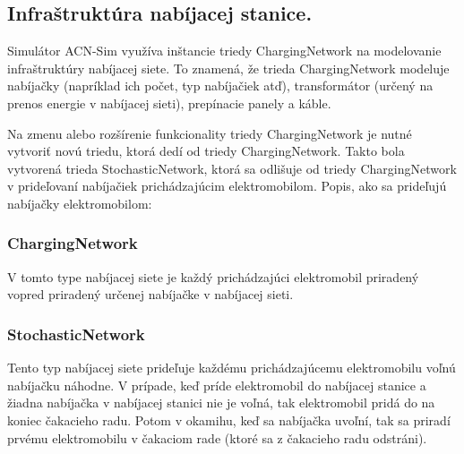 \subsection{Infraštruktúra nabíjacej stanice.}

Simulátor ACN-Sim využíva inštancie triedy ChargingNetwork na modelovanie infraštruktúry nabíjacej siete. To znamená, že trieda ChargingNetwork modeluje nabíjačky (napríklad ich počet, typ nabíjačiek atď), transformátor (určený na prenos energie v nabíjacej sieti), prepínacie panely a káble. 

Na zmenu alebo rozšírenie funkcionality triedy ChargingNetwork je nutné vytvoriť novú triedu, ktorá dedí od triedy ChargingNetwork. Takto bola vytvorená trieda StochasticNetwork, ktorá sa odlišuje od triedy ChargingNetwork v prideľovaní nabíjačiek prichádzajúcim elektromobilom. Popis, ako sa prideľujú nabíjačky elektromobilom:


\subsubsection*{ChargingNetwork} V tomto type nabíjacej siete je každý prichádzajúci elektromobil priradený vopred priradený určenej nabíjačke v nabíjacej sieti. 

\subsubsection*{StochasticNetwork} Tento typ nabíjacej siete prideľuje každému prichádzajúcemu elektromobilu voľnú nabíjačku náhodne. V prípade, keď príde elektromobil do nabíjacej stanice a žiadna nabíjačka v nabíjacej stanici nie je voľná, tak elektromobil pridá do na koniec čakacieho radu. Potom v okamihu, keď sa nabíjačka uvoľní, tak sa priradí prvému elektromobilu v čakaciom rade (ktoré sa z čakacieho radu odstráni).   \\



%



